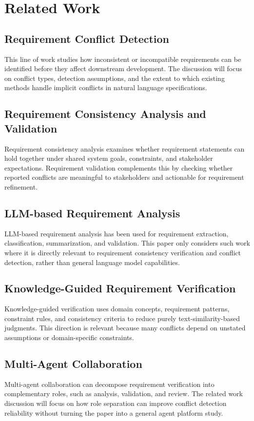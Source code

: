 \section{Related Work}
\label{related_work}

\subsection{Requirement Conflict Detection}
This line of work studies how inconsistent or incompatible requirements can be
identified before they affect downstream development. The discussion will focus on
conflict types, detection assumptions, and the extent to which existing methods
handle implicit conflicts in natural language specifications.

\subsection{Requirement Consistency Analysis and Validation}
Requirement consistency analysis examines whether requirement statements can hold
together under shared system goals, constraints, and stakeholder expectations.
Requirement validation complements this by checking whether reported conflicts are
meaningful to stakeholders and actionable for requirement refinement.

\subsection{LLM-based Requirement Analysis}
LLM-based requirement analysis has been used for requirement extraction,
classification, summarization, and validation. This paper only considers such work
where it is directly relevant to requirement consistency verification and conflict
detection, rather than general language model capabilities.

\subsection{Knowledge-Guided Requirement Verification}
Knowledge-guided verification uses domain concepts, requirement patterns, constraint
rules, and consistency criteria to reduce purely text-similarity-based judgments.
This direction is relevant because many conflicts depend on unstated assumptions or
domain-specific constraints.

\subsection{Multi-Agent Collaboration}
Multi-agent collaboration can decompose requirement verification into complementary
roles, such as analysis, validation, and review. The related work discussion will
focus on how role separation can improve conflict detection reliability without
turning the paper into a general agent platform study.
